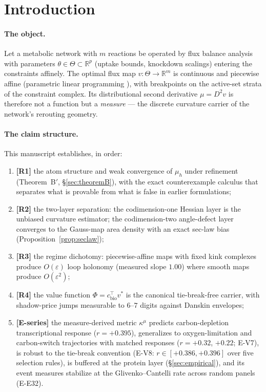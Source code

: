 \documentclass[11pt,a4paper]{article}
\theoremstyle{plain}
\theoremstyle{definition}
\theoremstyle{remark}
\newcommand{\kmu}{\kappa^{\mu}}
\newcommand{\RR}{\mathbb{R}}
\begin{document}
\bigskip

\section{Introduction}\label{sec:intro}

\paragraph{The object.}
Let a metabolic network with $m$ reactions be operated by flux balance
analysis \citep{varma1994, orth2010} with parameters $\theta \in \Theta \subset \RR^p$ (uptake bounds,
knockdown scalings) entering the constraints affinely. The optimal flux map
$v : \Theta \to \RR^m$ is continuous and piecewise affine (parametric
linear programming \citep{borrelli2003}), with breakpoints on the active-set strata of the
constraint complex. Its distributional second derivative
$\mu = D^2 v$ is therefore not a function but a \emph{measure} --- the
discrete curvature carrier of the network's rerouting geometry.

\paragraph{The claim structure.}
This manuscript establishes, in order:
\begin{enumerate}[label=(\roman*)]
\item \textbf{[R1]} the atom structure and weak convergence of $\mu_h$
      under refinement (Theorem~B$'$, \S\ref{sec:theoremB}), with the
      exact counterexample calculus that separates what is provable from
      what is false in earlier formulations;
\item \textbf{[R2]} the two-layer separation: the codimension-one Hessian
      layer is the unbiased curvature estimator; the codimension-two
      angle-defect layer converges to the Gauss-map area density with an
      exact sec-law bias (Proposition~\ref{prop:seclaw});
\item \textbf{[R3]} the regime dichotomy: piecewise-affine maps with fixed
      kink complexes produce $O(\varepsilon)$ loop holonomy (measured slope
      $1.00$) where smooth maps produce $O(\varepsilon^2)$;
\item \textbf{[R4]} the value function $\Phi = c_{\mathrm{bio}}^\top v^*$
      is the canonical tie-break-free carrier, with shadow-price jumps
      measurable to $6$--$7$ digits against Danskin envelopes;
\item \textbf{[E-series]} the measure-derived metric $\kmu$ predicts
      carbon-depletion transcriptional response ($r = +0.395$),
      generalizes to oxygen-limitation and carbon-switch trajectories
      with matched responses ($r = +0.32$, $+0.22$; E-V7), is robust
      to the tie-break convention (E-V8: $r \in [+0.386, +0.396]$
      over five selection rules), is buffered at the protein layer
      (\S\ref{sec:empirical}), and its event measures stabilize at
      the Glivenko--Cantelli rate across random panels (E-E32).
\end{enumerate}
\end{document}
